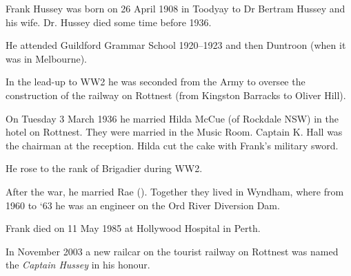 
Frank Hussey was born on 26 April 1908 in Toodyay\cite{RaeWestAus} to Dr Bertram Hussey and his wife.\cite{WesternMail1936}
Dr. Hussey died some time before 1936.\cite{MilitaryWedding}

He attended Guildford Grammar School 1920--1923\cite{FBHguildford}
and then Duntroon (when it was in Melbourne).\cite{RaeWestAus}

In the lead-up to WW2 he was seconded from the Army to oversee the construction of the railway on Rottnest (from Kingston Barracks to Oliver Hill).\cite{RaeWestAus}

On Tuesday 3 March 1936 he married Hilda McCue (of Rockdale NSW\cite{WestAus1936p4})
in the hotel on Rottnest.\cite{WestAus1936p19}
They were married in the Music Room.\cite{MilitaryWedding}
Captain K. Hall was the chairman at the reception.\cite{MilitaryWedding}
Hilda cut the cake with Frank's military sword.\cite{MilitaryWedding}

He rose to the rank of Brigadier during WW2.\cite{FBHwar}

After the war, he married Rae (). Together they lived in Wyndham,
where from 1960 to `63 he was an engineer on the Ord River Diversion Dam.

Frank died on 11 May 1985 at Hollywood Hospital in Perth.

In November 2003 a new railcar on the tourist railway on Rottnest was named the \emph{Captain Hussey} in his honour.\cite{RIA2004}
